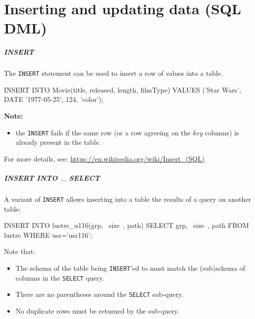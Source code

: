 \documentclass[english,serif,mathserif]{beamer}
\begin{document}
\part{Inserting and updating data (SQL DML)}

\begin{frame}[fragile]
  \frametitle{INSERT}

  The \texttt{INSERT} statement can be used to insert a row of values into a
  table.
  \begin{sql}
    INSERT INTO Movie(title, released, length, filmType)
    VALUES ('Star Wars', DATE '1977-05-25', 124, 'color');
  \end{sql}

  \+
  \textbf{Note:}
  \begin{itemize}
  \item
    the \texttt{INSERT} fails if the same row (or a row agreeing on
    the \emph{key} columns) is already present in the table.
  \end{itemize}

  \+
  \begin{references}
    For more details, see:
    \url{https://en.wikipedia.org/wiki/Insert_(SQL)}
  \end{references}
\end{frame}


\begin{frame}[fragile]
  \frametitle{INSERT INTO $\ldots$ SELECT}\small

  A variant of \texttt{INSERT} allows inserting into a table the results of a
  query on another table:

  \+
  \begin{sql}
    INSERT INTO lustre_u116(grp, ~size~, path)
    SELECT grp, ~size~, path FROM lustre
    WHERE usr='usr116';
  \end{sql}

  \+
  Note that:
  \begin{itemize}
  \item The schema of the table being \texttt{INSERT}'ed to must match the
    (sub)schema of columns in the \texttt{SELECT} query.
  \item There are no parentheses around the \texttt{SELECT} sub-query.
  \item No duplicate rows must be returned by the sub-query.
  \end{itemize}
\end{frame}
\end{document}
